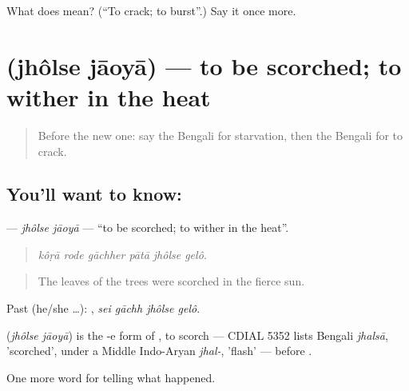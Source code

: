 \begin{tcolorbox}[breakable,colback=teal!4,colframe=teal!35!black,title={Before you move on}]
What does  mean? (\textquotedblleft{}To crack; to burst\textquotedblright{}.) Say it once more.
\end{tcolorbox}
\section[\texorpdfstring{\bn{ঝলসে} \bn{যাওয়া} (jhôlse jāoyā)}{ঝলসে যাওয়া (jhôlse jāoyā)}]{  (jhôlse jāoyā) — to be scorched; to wither in the heat}

\label{lesson:BN-C292-jholse-jaoya}



\begin{quote}
Before the new one: say the Bengali for starvation, then the Bengali for to crack.
\end{quote}

\subsection*{You'll want to know:  }
\textbf{ } — \emph{jhôlse jāoyā} — \textquotedblleft{}to be scorched; to wither in the heat\textquotedblright{}.

\begin{quote}
     
\end{quote}

\begin{quote}
\emph{kôṛā rode gāchher pātā jhôlse gelô.}
\end{quote}

\begin{quote}
The leaves of the trees were scorched in the fierce sun.
\end{quote}

Past (he/she …):    , \emph{sei gāchh jhôlse gelô}.

\begin{cousinweb}
\textbf{ } (\emph{jhôlse jāoyā}) is the -e form of , to scorch — CDIAL 5352 lists Bengali \emph{jhalsā}, 'scorched', under a Middle Indo-Aryan \emph{jhal-}, 'flash' — before \textbf{}.
\end{cousinweb}

\begin{grammarlens}[title={What you've built}]
One more word for telling what happened.
\end{grammarlens}

